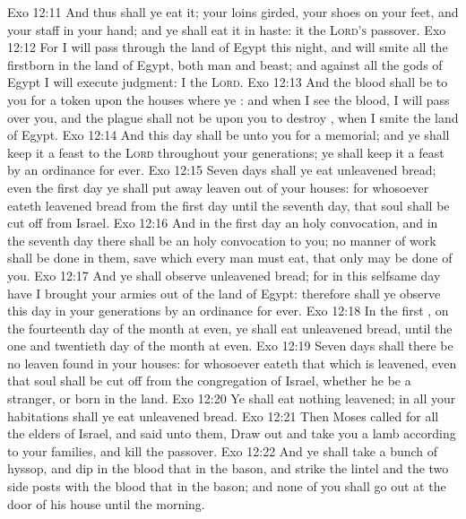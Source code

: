\vs Exo 12:11 And thus shall ye eat it;  your loins girded, your shoes on your feet, and your staff in your hand; and ye shall eat it in haste: it  the \textsc{Lord's} passover.
\vs Exo 12:12 For I will pass through the land of Egypt this night, and will smite all the firstborn in the land of Egypt, both man and beast; and against all the gods of Egypt I will execute judgment: I  the \textsc{Lord}.
\vs Exo 12:13 And the blood shall be to you for a token upon the houses where ye : and when I see the blood, I will pass over you, and the plague shall not be upon you to destroy , when I smite the land of Egypt.
\vs Exo 12:14 And this day shall be unto you for a memorial; and ye shall keep it a feast to the \textsc{Lord} throughout your generations; ye shall keep it a feast by an ordinance for ever.
\vs Exo 12:15 Seven days shall ye eat unleavened bread; even the first day ye shall put away leaven out of your houses: for whosoever eateth leavened bread from the first day until the seventh day, that soul shall be cut off from Israel.
\vs Exo 12:16 And in the first day  an holy convocation, and in the seventh day there shall be an holy convocation to you; no manner of work shall be done in them, save  which every man must eat, that only may be done of you.
\vs Exo 12:17 And ye shall observe  unleavened bread; for in this selfsame day have I brought your armies out of the land of Egypt: therefore shall ye observe this day in your generations by an ordinance for ever.
\vs Exo 12:18 In the first , on the fourteenth day of the month at even, ye shall eat unleavened bread, until the one and twentieth day of the month at even.
\vs Exo 12:19 Seven days shall there be no leaven found in your houses: for whosoever eateth that which is leavened, even that soul shall be cut off from the congregation of Israel, whether he be a stranger, or born in the land.
\vs Exo 12:20 Ye shall eat nothing leavened; in all your habitations shall ye eat unleavened bread.
\vs Exo 12:21 Then Moses called for all the elders of Israel, and said unto them, Draw out and take you a lamb according to your families, and kill the passover.
\vs Exo 12:22 And ye shall take a bunch of hyssop, and dip  in the blood that  in the bason, and strike the lintel and the two side posts with the blood that  in the bason; and none of you shall go out at the door of his house until the morning.
